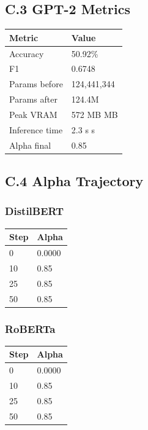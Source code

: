 \subsection{C.3 GPT-2 Metrics}

\begin{table}[H]
\centering
\small
\begin{tabular}{ll}
\toprule
\textbf{Metric} & \textbf{Value} \\
\midrule
Accuracy & 50.92\% \\
F1 & 0.6748 \\
Params before & 124,441,344 \\
Params after & 124.4M \\
Peak VRAM & 572 MB MB \\
Inference time & 2.3 s s \\
Alpha final & 0.85 \\
\bottomrule
\end{tabular}
\end{table}

\subsection{C.4 Alpha Trajectory}

\subsubsection{DistilBERT}

\begin{table}[H]
\centering
\small
\begin{tabular}{ll}
\toprule
\textbf{Step} & \textbf{Alpha} \\
\midrule
0 & 0.0000 \\
10 & 0.85 \\
25 & 0.85 \\
50 & 0.85 \\
\bottomrule
\end{tabular}
\end{table}

\subsubsection{RoBERTa}

\begin{table}[H]
\centering
\small
\begin{tabular}{ll}
\toprule
\textbf{Step} & \textbf{Alpha} \\
\midrule
0 & 0.0000 \\
10 & 0.85 \\
25 & 0.85 \\
50 & 0.85 \\
\bottomrule
\end{tabular}
\end{table}

